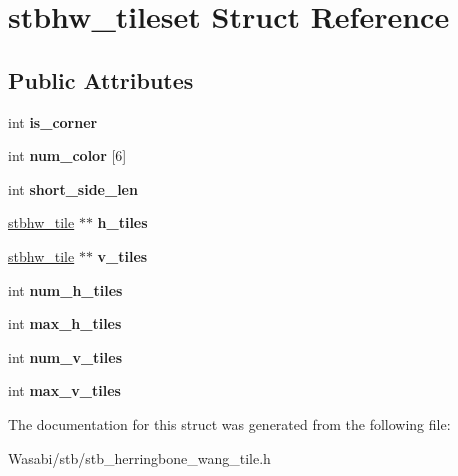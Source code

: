 \hypertarget{structstbhw__tileset}{}\section{stbhw\+\_\+tileset Struct Reference}
\label{structstbhw__tileset}
\subsection*{Public Attributes}
\begin{DoxyCompactItemize}
\item 
int {\bfseries is\+\_\+corner}\hypertarget{structstbhw__tileset_ae3db1084e448d1a9ddcc6b89b13f6926}{}\label{structstbhw__tileset_ae3db1084e448d1a9ddcc6b89b13f6926}

\item 
int {\bfseries num\+\_\+color} \mbox{[}6\mbox{]}\hypertarget{structstbhw__tileset_afc9279637121847c9f0b87c1c313970d}{}\label{structstbhw__tileset_afc9279637121847c9f0b87c1c313970d}

\item 
int {\bfseries short\+\_\+side\+\_\+len}\hypertarget{structstbhw__tileset_aeeb42404735a2b94e366f737b9b2ecec}{}\label{structstbhw__tileset_aeeb42404735a2b94e366f737b9b2ecec}

\item 
\hyperlink{structstbhw__tile}{stbhw\+\_\+tile} $\ast$$\ast$ {\bfseries h\+\_\+tiles}\hypertarget{structstbhw__tileset_ae01780a7755cdcd7eb378f36325134bf}{}\label{structstbhw__tileset_ae01780a7755cdcd7eb378f36325134bf}

\item 
\hyperlink{structstbhw__tile}{stbhw\+\_\+tile} $\ast$$\ast$ {\bfseries v\+\_\+tiles}\hypertarget{structstbhw__tileset_a46098bf759f62463d86430557640d888}{}\label{structstbhw__tileset_a46098bf759f62463d86430557640d888}

\item 
int {\bfseries num\+\_\+h\+\_\+tiles}\hypertarget{structstbhw__tileset_ab98c03e3cff56b898644d2421245508a}{}\label{structstbhw__tileset_ab98c03e3cff56b898644d2421245508a}

\item 
int {\bfseries max\+\_\+h\+\_\+tiles}\hypertarget{structstbhw__tileset_ad4c8a93ab05c268c17b9fb6e07600983}{}\label{structstbhw__tileset_ad4c8a93ab05c268c17b9fb6e07600983}

\item 
int {\bfseries num\+\_\+v\+\_\+tiles}\hypertarget{structstbhw__tileset_a9960f840ecb4bdf7f5d9a0203cdf15b0}{}\label{structstbhw__tileset_a9960f840ecb4bdf7f5d9a0203cdf15b0}

\item 
int {\bfseries max\+\_\+v\+\_\+tiles}\hypertarget{structstbhw__tileset_ac75944ca10bee5eb4b4e29712f002886}{}\label{structstbhw__tileset_ac75944ca10bee5eb4b4e29712f002886}

\end{DoxyCompactItemize}


The documentation for this struct was generated from the following file\+:\begin{DoxyCompactItemize}
\item 
Wasabi/stb/stb\+\_\+herringbone\+\_\+wang\+\_\+tile.\+h\end{DoxyCompactItemize}
